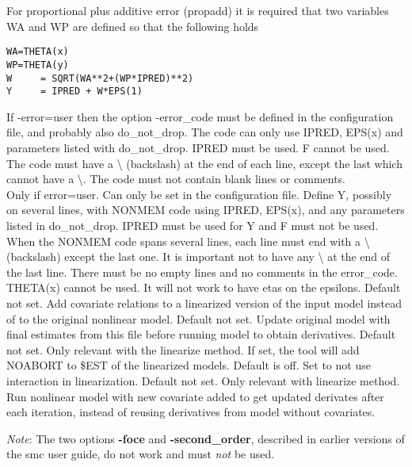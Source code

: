 \begin{optionlist}
For proportional plus additive error (propadd) it is required that two variables WA and WP are defined so that the following holds 
\begin{verbatim}
WA=THETA(x)
WP=THETA(y)
W     = SQRT(WA**2+(WP*IPRED)**2)
Y     = IPRED + W*EPS(1)
\end{verbatim}
If -error=user then the option -error\_code must be defined in the configuration file, and probably also do\_not\_drop. The code can only use IPRED, EPS(x) and parameters listed with do\_not\_drop. IPRED must be used. F cannot be used. The code must have a \textbackslash{} (backslash) at the end of each line, except the last which cannot have a \textbackslash{}. The code must not contain blank lines or comments.  \\
\nextopt
{}
Only if error=user. Can only be set in the configuration file. Define Y, possibly on several lines, with NONMEM code using IPRED, EPS(x), and any parameters listed in do\_not\_drop. IPRED must be used for Y and F must not be used. When the NONMEM code spans several lines, each line must end with a \textbackslash{} (backslash) except the last one. It is important not to have any \textbackslash{}  at the end of the last line. There must be no empty lines and no comments in the error\_code. THETA(x) cannot be used. It will not work to have etas on the epsilons. 
\nextopt
{}
Default not set. Add covariate relations to a linearized version of the input model instead of to the original nonlinear model.
\nextopt
{}
Default not set. Update original model with final estimates from this file before running model to obtain derivatives. 
\nextopt
{}
Default not set. Only relevant with the linearize method. If set, the tool will add NOABORT to \$EST of the linearized models. 
\nextopt
{}
Default is off. Set to not use interaction in linearization.
\nextopt
{}
Default not set. Only relevant with linearize method. Run nonlinear model with new covariate added to get updated derivates after each iteration, instead of reusing derivatives from model without covariates.
\nextopt
\end{optionlist}
\emph{Note}: The two options \textbf{-foce} and \textbf{-second\_order}, described in earlier versions of the smc user guide, do not work and must \emph{not} be used.

